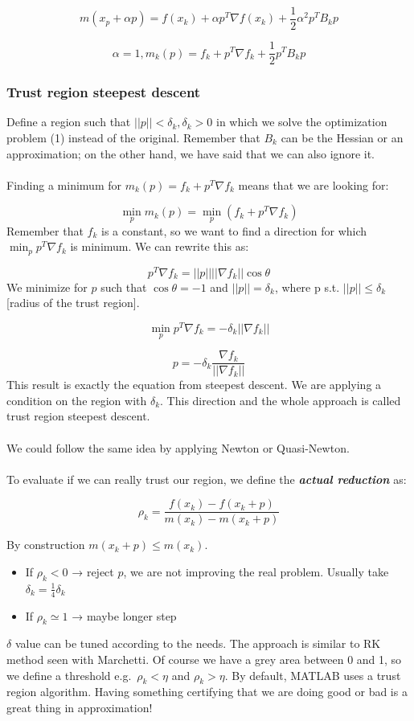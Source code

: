 $$
m(x_p+\alpha p)=f(x_k)+\alpha p^T \nabla f(x_k)+ \frac{1}{2} \alpha^2p^T B_k p
$$

$$
\alpha=1, m_k (p)=f_k+p^T\nabla f_k + \frac{1}{2} p^T B_k p
$$

\hypertarget{trust-region-steepest-descent}{%
\subsubsection{Trust region steepest
descent}\label{trust-region-steepest-descent}}

Define a region such that $||p|| < \delta_k,\delta_k>0$ in which we
solve the optimization problem (1) instead of the original. Remember
that $B_k$ can be the Hessian or an approximation; on the other hand, we
have said that we can also ignore it.
\\
\\
\noindent
Finding a minimum for $m_k(p)=f_k+p^T\nabla f_k$ means that we are
looking for:

$$
\min_p m_k(p)= \min_p (f_k+p^T\nabla f_k)
$$
\noindent
Remember that $f_k$ is a constant, so we want to find a direction for
which $\min_p p^T\nabla f_k$ is minimum. We can rewrite this as:

$$
p^T\nabla f_k = ||p|| ||\nabla f_k|| \cos \theta
$$
\noindent
We minimize for $p$ such that $\cos \theta = -1$ and $||p||=\delta_k$,
where p s.t. $||p|| \leq \delta_k$ {[}radius of the trust region{]}.

$$
\min_p p^T\nabla f_k = -\delta_k || \nabla f_k ||
$$

$$
p = - \delta_k \frac{\nabla f_k}{||\nabla f_k||}
$$
\noindent
This result is exactly the equation from steepest descent. We are
applying a condition on the region with $\delta_k$. This direction and
the whole approach is called trust region steepest descent.
\\
\\
\noindent
We could follow the same idea by applying Newton or Quasi-Newton.
\\
\\
\noindent
To evaluate if we can really trust our region, we define the
\textbf{\emph{actual reduction}} as:

$$
\rho_k = \frac{f(x_k)-f(x_k+p)}{m(x_k)-m(x_k+p)}
$$

By construction $m(x_k+p) \leq m(x_k)$.

\begin{itemize}
\tightlist
\item
  If $\rho_k < 0$ → reject $p$, we are not improving the real problem.
  Usually take $\delta_k = \frac{1}{4} \delta_k$
\item
  If $\rho_k \simeq 1$ → maybe longer step
\end{itemize}
\noindent
$\delta$ value can be tuned according to the needs. The approach is
similar to RK method seen with Marchetti. Of course we have a grey area
between 0 and 1, so we define a threshold e.g.~$\rho_k < \eta$ and
$\rho_k > \eta$.
\noindent
By default, MATLAB uses a trust region algorithm. Having something
certifying that we are doing good or bad is a great thing in
approximation!


